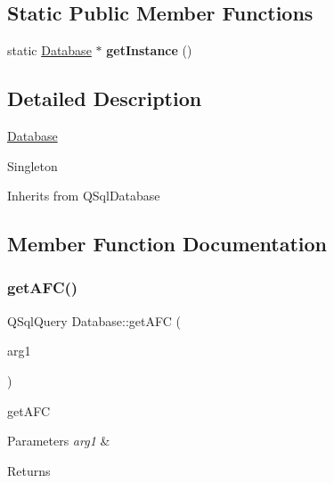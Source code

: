 \subsection*{Static Public Member Functions}
\begin{DoxyCompactItemize}
\item 
\mbox{\label{class_database_a5a3b028f980a577ea0b809eb92312761}} 
static \hyperlink{class_database}{Database} $\ast$ {\bfseries get\+Instance} ()
\end{DoxyCompactItemize}


\subsection{Detailed Description}
\hyperlink{class_database}{Database}
\begin{DoxyItemize}
\item Singleton
\item Inherits from Q\+Sql\+Database 
\end{DoxyItemize}

\subsection{Member Function Documentation}
\mbox{\label{class_database_a00061fa9ad27c4a877ca9dee9cccdfd2}} 
\subsubsection{\texorpdfstring{get\+A\+F\+C()}{getAFC()}}
{\footnotesize\ttfamily Q\+Sql\+Query Database\+::get\+A\+FC (\begin{DoxyParamCaption}\item[{const Q\+String \&}]{arg1 }\end{DoxyParamCaption})}



get\+A\+FC 


\begin{DoxyParams}{Parameters}
{\em arg1} & \\
\hline
\end{DoxyParams}
\begin{DoxyReturn}{Returns}

\end{DoxyReturn}
\mbox{\label{class_database_a41a013a764f486b48461516634efa80f}} 
